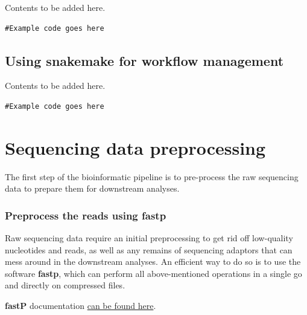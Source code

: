 \documentclass[
]{book}
\begin{document}
Contents to be added here.

\begin{verbatim}
#Example code goes here
\end{verbatim}

\hypertarget{using-snakemake}{%
\section{Using snakemake for workflow management}\label{using-snakemake}}

Contents to be added here.

\begin{verbatim}
#Example code goes here
\end{verbatim}

\hypertarget{sequencing-data-preprocessing}{%
\chapter{Sequencing data preprocessing}\label{sequencing-data-preprocessing}}

The first step of the bioinformatic pipeline is to pre-process the raw sequencing data to prepare them for downstream analyses.

\hypertarget{preprocess-the-reads-using-fastp}{%
\subsection*{Preprocess the reads using fastp}\label{preprocess-the-reads-using-fastp}}

Raw sequencing data require an initial preprocessing to get rid off low-quality nucleotides and reads, as well as any remains of sequencing adaptors that can mess around in the downstream analyses. An efficient way to do so is to use the software \textbf{fastp}, which can perform all above-mentioned operations in a single go and directly on compressed files.

\textbf{fastP} documentation \href{https://github.com/OpenGene/fastp}{can be found here}.
\end{document}
